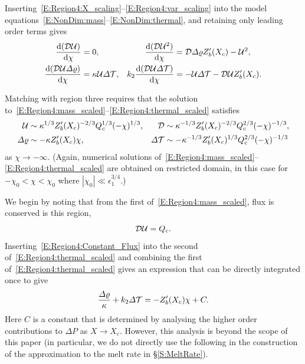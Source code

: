 \documentclass[openacc]{rsproca_new}%
\newcommand{\dd}[2]{\frac{\mathrm{d} #1}{\mathrm{d} #2}}
\newcommand{\epsone}{\epsilon_{1}} %
\begin{document}
Inserting~\eqref{E:Region4:X_scaling}--\eqref{E:Region4:var_scaling} into the model equations~\eqref{E:NonDim:mass}--\eqref{E:NonDim:thermal}, and retaining only leading order terms gives
\begin{align}
\dd{(\D\U)}{\chi} &=0, &
\dd{(\D \U^2)}{\chi} &=  \D \p Z_b'(X_c) -\U^2,\label{E:Region4:mass_scaled}\\
\dd{(\D\U\p)}{\chi} &=\kappa  \U\t, &
k_2 \dd{(\D \U \t)}{\chi} &=- \U \t - \D \U Z_b'(X_c).\label{E:Region4:thermal_scaled}
\end{align}


Matching with region three requires that the solution to~\eqref{E:Region4:mass_scaled}--\eqref{E:Region4:thermal_scaled} satisfies
\begin{align}
\mathcal{U} &\sim \kappa^{1/3}Z_b'(X_c)^{-2/3}Q_c^{1/3} (-\chi)^{1/3}, &  \mathcal{D} &\sim \kappa^{-1/3} Z_b'(X_c)^{-2/3} Q_c^{2/3}(-\chi)^{-1/3}\label{E:Region4:far_field1},\\
\varDelta \varrho &\sim - \kappa Z_b'(X_c) \chi, & \varDelta \mathcal{T} &\sim -\kappa^{-1/3} Z_b'(X_c)^{1/3} Q_c^{2/3}(-\chi)^{-1/3}\label{E:Region4:far_field2}
\end{align}
as $\chi \to -\infty$. (Again, numerical solutions of~\eqref{E:Region4:mass_scaled}--\eqref{E:Region4:thermal_scaled} are obtained on restricted domain, in this case for $-\chi_0 < \chi < \chi_0$ where $|\chi_0| \ll \epsone^{3/4}$.)

We begin by noting that from the first of~\eqref{E:Region4:mass_scaled}, flux is conserved is this region,
\begin{equation}\label{E:Region4:Constant_Flux}
\mathcal{D}\mathcal{U}  = Q_c.
\end{equation}
Inserting~\eqref{E:Region4:Constant_Flux} into the second of~\eqref{E:Region4:thermal_scaled} and combining the first of~\eqref{E:Region4:thermal_scaled} gives an expression that can be directly integrated once to give
\begin{equation}\label{E:Region4:Linear_p_t}
\frac{\varDelta \varrho}{\kappa} + k_2 \varDelta \mathcal{T} = -Z_b'(X_c)\chi + C.
\end{equation}
Here $C$ is a constant that is determined by analysing the higher order contributions to $\Delta P$ as $X \to X_c$. However, this analysis is beyond the scope of this paper (in particular, we do not directly use the following in the construction of the approximation to the melt rate in \S\ref{S:MeltRate}).
\end{document}
